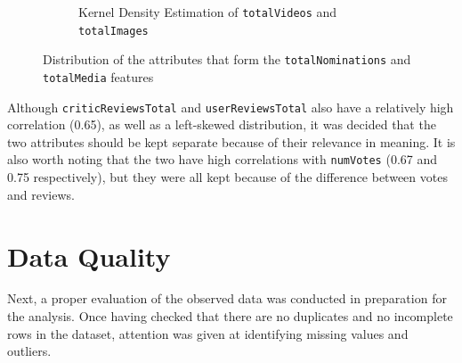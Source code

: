 \begin{figure}[H]
\begin{subfigure}{0.48\textwidth}
        \captionsetup{width=0.9\linewidth, justification=centering}
        \caption{Kernel Density Estimation of \texttt{totalVideos} and \texttt{totalImages}}
        \label{fig:sub2}
    \end{subfigure}
    \captionsetup{justification=centering}
    \caption{Distribution of the attributes that form the \texttt{totalNominations} and \texttt{totalMedia} features}
    \label{fig:distrib}
\end{figure}


Although \texttt{criticReviewsTotal} and \texttt{userReviewsTotal} also have a relatively high correlation (0.65), as well as a left-skewed distribution, it was decided that the two attributes should be kept separate because of their relevance in meaning. It is also worth noting that the two have high correlations with \texttt{numVotes} (0.67 and 0.75 respectively), but they were all kept because of the difference between votes and reviews.



\section{Data Quality}\label{sec:data_quality}
Next, a proper evaluation of the observed data was conducted in preparation for the analysis.
Once having checked that there are no duplicates and no incomplete rows in the dataset,
attention was given at identifying missing values and outliers.






